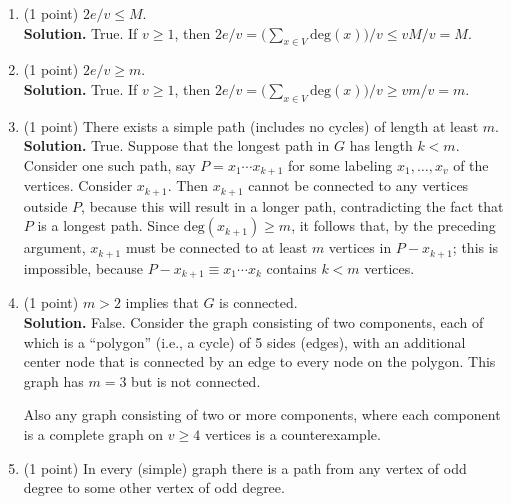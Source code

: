 \documentclass[11pt]{article}
\begin{document}
\begin{enumerate}
	\begin{enumerate}
		\item (1 point) $2e/v \le M$. \\

                   \textbf{Solution.} True. If $v \geq 1$, then $2e/v = \bigl(\sum_{x\in V}\text{deg}(x)\bigr)/v \leq vM/v = M$.

		\item (1 point) $2e/v \ge m$. \\

 \textbf{Solution.} True. If $v \geq 1$, then $2e/v = \bigl(\sum_{x\in V}\text{deg}(x)\bigr)/v \geq vm/v = m$.

\item (1 point) There exists a simple path (includes no cycles) of length at least $m$. \\
  
   \textbf{Solution.} True. Suppose that the longest path in $G$ has length $k < m$. Consider one such path, say $P = x_{1}\dotsb x_{k+1}$ for some labeling $x_{1}, \dotsc, x_{v}$ of the vertices. Consider $x_{k+1}$. Then $x_{k+1}$ cannot be connected to any vertices outside $P$, because this will result in a longer path, contradicting the fact that $P$ is a longest path. Since $\text{deg}(x_{k+1}) \geq m$, it follows that, by the preceding argument, $x_{k+1}$ must be connected to at least $m$ vertices in $P-x_{k+1}$; this is impossible, because $P-x_{k+1} \equiv x_{1} \dotsb x_{k}$ contains $k < m$ vertices. 
  
\item (1 point) $m > 2$ implies that $G$ is connected. \\
  
   \textbf{Solution.} False. Consider the graph consisting of two components, each of which is a ``polygon'' (i.e., a cycle) of 5 sides (edges), with an additional center node that is connected by an edge to every node on the polygon. This graph has $m = 3$ but is not connected. 
  
   Also any graph consisting of two or more components, where each component is a complete graph on $v \geq 4$ vertices is a counterexample. 
  
\item (1 point) In every (simple) graph there is a path from any vertex of odd degree to some other vertex of odd degree. \\



\end{enumerate}
\end{enumerate}
\end{document}
